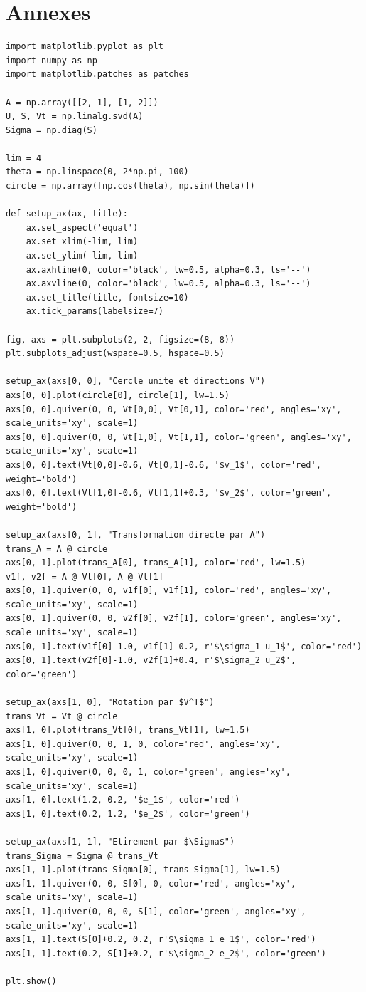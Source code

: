 \documentclass[12pt]{report}
\begin{document}
\clearpage
\section*{Annexes}
\begin{minipage}{\textwidth}
    \begin{lstlisting}[caption={Visualisation de la DVS avec Python}, label={lst:svd_code}, basicstyle=\ttfamily\scriptsize]
import matplotlib.pyplot as plt
import numpy as np
import matplotlib.patches as patches

A = np.array([[2, 1], [1, 2]])
U, S, Vt = np.linalg.svd(A)
Sigma = np.diag(S)

lim = 4
theta = np.linspace(0, 2*np.pi, 100)
circle = np.array([np.cos(theta), np.sin(theta)])

def setup_ax(ax, title):
    ax.set_aspect('equal')
    ax.set_xlim(-lim, lim)
    ax.set_ylim(-lim, lim)
    ax.axhline(0, color='black', lw=0.5, alpha=0.3, ls='--')
    ax.axvline(0, color='black', lw=0.5, alpha=0.3, ls='--')
    ax.set_title(title, fontsize=10)
    ax.tick_params(labelsize=7)

fig, axs = plt.subplots(2, 2, figsize=(8, 8))
plt.subplots_adjust(wspace=0.5, hspace=0.5)

setup_ax(axs[0, 0], "Cercle unite et directions V")
axs[0, 0].plot(circle[0], circle[1], lw=1.5)
axs[0, 0].quiver(0, 0, Vt[0,0], Vt[0,1], color='red', angles='xy', scale_units='xy', scale=1)
axs[0, 0].quiver(0, 0, Vt[1,0], Vt[1,1], color='green', angles='xy', scale_units='xy', scale=1)
axs[0, 0].text(Vt[0,0]-0.6, Vt[0,1]-0.6, '$v_1$', color='red', weight='bold')
axs[0, 0].text(Vt[1,0]-0.6, Vt[1,1]+0.3, '$v_2$', color='green', weight='bold')

setup_ax(axs[0, 1], "Transformation directe par A")
trans_A = A @ circle
axs[0, 1].plot(trans_A[0], trans_A[1], color='red', lw=1.5)
v1f, v2f = A @ Vt[0], A @ Vt[1]
axs[0, 1].quiver(0, 0, v1f[0], v1f[1], color='red', angles='xy', scale_units='xy', scale=1)
axs[0, 1].quiver(0, 0, v2f[0], v2f[1], color='green', angles='xy', scale_units='xy', scale=1)
axs[0, 1].text(v1f[0]-1.0, v1f[1]-0.2, r'$\sigma_1 u_1$', color='red')
axs[0, 1].text(v2f[0]-1.0, v2f[1]+0.4, r'$\sigma_2 u_2$', color='green')

setup_ax(axs[1, 0], "Rotation par $V^T$")
trans_Vt = Vt @ circle
axs[1, 0].plot(trans_Vt[0], trans_Vt[1], lw=1.5)
axs[1, 0].quiver(0, 0, 1, 0, color='red', angles='xy', scale_units='xy', scale=1)
axs[1, 0].quiver(0, 0, 0, 1, color='green', angles='xy', scale_units='xy', scale=1)
axs[1, 0].text(1.2, 0.2, '$e_1$', color='red')
axs[1, 0].text(0.2, 1.2, '$e_2$', color='green')

setup_ax(axs[1, 1], "Etirement par $\Sigma$")
trans_Sigma = Sigma @ trans_Vt
axs[1, 1].plot(trans_Sigma[0], trans_Sigma[1], lw=1.5)
axs[1, 1].quiver(0, 0, S[0], 0, color='red', angles='xy', scale_units='xy', scale=1)
axs[1, 1].quiver(0, 0, 0, S[1], color='green', angles='xy', scale_units='xy', scale=1)
axs[1, 1].text(S[0]+0.2, 0.2, r'$\sigma_1 e_1$', color='red')
axs[1, 1].text(0.2, S[1]+0.2, r'$\sigma_2 e_2$', color='green')

plt.show()
\end{lstlisting}
\end{minipage}
\end{document}
